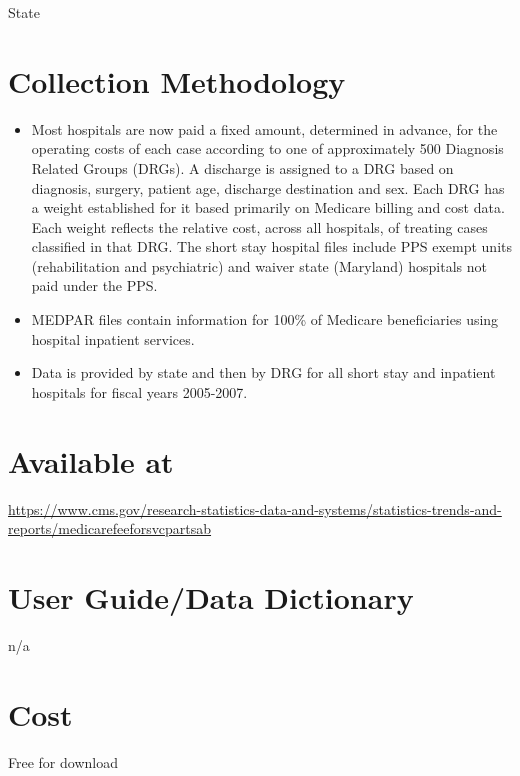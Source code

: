 \documentclass[
]{book}
\providecommand{\tightlist}{%
  \setlength{\itemsep}{0pt}\setlength{\parskip}{0pt}}
\begin{document}
State

\hypertarget{collection-methodology-39}{%
\section{Collection Methodology}\label{collection-methodology-39}}

\begin{itemize}
\tightlist
\item
  Most hospitals are now paid a fixed amount, determined in advance, for the operating costs of each case according to one of approximately 500 Diagnosis Related Groups (DRGs). A discharge is assigned to a DRG based on diagnosis, surgery, patient age, discharge destination and sex. Each DRG has a weight established for it based primarily on Medicare billing and cost data. Each weight reflects the relative cost, across all hospitals, of treating cases classified in that DRG. The short stay hospital files include PPS exempt units (rehabilitation and psychiatric) and waiver state (Maryland) hospitals not paid under the PPS.
\item
  MEDPAR files contain information for 100\% of Medicare beneficiaries using hospital inpatient services.
\item
  Data is provided by state and then by DRG for all short stay and inpatient hospitals for fiscal years 2005-2007.
\end{itemize}

\hypertarget{available-at-39}{%
\section{Available at}\label{available-at-39}}

\url{https://www.cms.gov/research-statistics-data-and-systems/statistics-trends-and-reports/medicarefeeforsvcpartsab}

\hypertarget{user-guidedata-dictionary-39}{%
\section{User Guide/Data Dictionary}\label{user-guidedata-dictionary-39}}

n/a

\hypertarget{cost-39}{%
\section{Cost}\label{cost-39}}

Free for download
\end{document}

